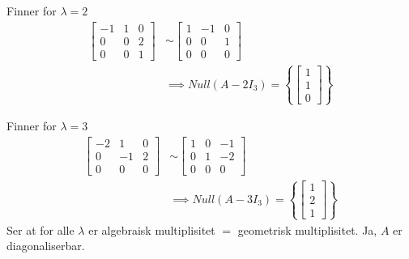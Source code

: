 \documentclass[11pt, a4paper, norsk]{NTNUoving}
\begin{document}
\begin{oppgave}
\begin{punkt}
            Finner for $\lambda = 2$
            \begin{align*}
                \begin{bmatrix}
                    -1 & 1 & 0 \\
                    0 & 0 & 2 \\
                    0 & 0 & 1
                \end{bmatrix} &\sim \begin{bmatrix}
                1 & -1 & 0 \\
                0 & 0 & 1 \\
                0 & 0 & 0
                \end{bmatrix}
                \\
                &\implies Null(A - 2I_3) = \left\{\begin{bmatrix}
                    1 \\
                    1 \\
                    0
                \end{bmatrix}\right\}
            \end{align*}
            
            Finner for $\lambda = 3$
            \begin{align*}
                \begin{bmatrix}
                    -2 & 1 & 0 \\
                    0 & -1 & 2 \\
                    0 & 0 & 0
                \end{bmatrix} &\sim \begin{bmatrix}
                1 & 0 & -1 \\
                0 & 1 & -2 \\
                0 & 0 & 0
                \end{bmatrix}
                \\
                &\implies Null(A - 3I_3) = \left\{\begin{bmatrix}
                    1 \\
                    2 \\
                    1
                \end{bmatrix}\right\}
            \end{align*}
            Ser at for alle $\lambda$ er algebraisk multiplisitet $=$ geometrisk multiplisitet. Ja, $A$ er diagonaliserbar.
        \end{punkt}
    \end{oppgave}
\end{document}
